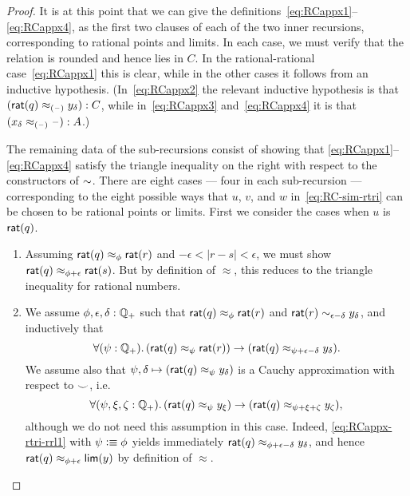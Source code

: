 \begin{proof}
  It is at this point that we can give the definitions~\eqref{eq:RCappx1}--\eqref{eq:RCappx4}, as the first two clauses of each of the two inner recursions, corresponding to rational points and limits.
  In each case, we must verify that the relation is rounded and hence lies in $C$.
  In the rational-rational case~\eqref{eq:RCappx1} this is clear, while in the other cases it follows from an inductive hypothesis.
  (In~\eqref{eq:RCappx2} the relevant inductive hypothesis is that $(\mathsf{rat}(q) \approx_{(\mathord{\hspace{1pt}\text{--}\hspace{1pt}})} y_\delta) : C$, while in~\eqref{eq:RCappx3} and~\eqref{eq:RCappx4} it is that $(x_\delta \approx_{(\mathord{\hspace{1pt}\text{--}\hspace{1pt}})} \mathord{\hspace{1pt}\text{--}\hspace{1pt}}) : A$.)

  The remaining data of the sub-recursions consist of showing that \eqref{eq:RCappx1}--\eqref{eq:RCappx4} satisfy the triangle inequality on the right with respect to the constructors of $\mathord\sim$.
  There are eight cases --- four in each sub-recursion --- corresponding to the eight possible ways that $u$, $v$, and $w$ in~\eqref{eq:RC-sim-rtri} can be chosen to be rational points or limits.
  First we consider the cases when $u$ is $\mathsf{rat}(q)$.
  \begin{enumerate}
  \item Assuming $\mathsf{rat}(q)\approx_\phi \mathsf{rat}(r)$ and $-\epsilon<|r-s|<\epsilon$, we must show $\mathsf{rat}(q)\approx_{\phi+\epsilon} \mathsf{rat}(s)$.
    But by definition of $\approx$, this reduces to the triangle inequality for rational numbers.
  \item We assume $\phi,\epsilon,\delta:\mathbb{Q}_{+}$ such that $\mathsf{rat}(q)\approx_\phi \mathsf{rat}(r)$ and $\mathsf{rat}(r) \sim_{\epsilon-\delta} y_\delta$, and inductively that
    \begin{equation}
      \fall{\psi:\Qp}(\rcrat(q) \approx_{\psi} \rcrat(r)) \to (\rcrat(q) \approx_{\psi+\epsilon-\delta} y_\delta).\label{eq:RCappx-rtri-rrl1}
    \end{equation}
    We assume also that $\psi,\delta\mapsto (\mathsf{rat}(q) \approx_{\psi} y_\delta)$ is a Cauchy approximation with respect to $\smile$, i.e.\
    \begin{equation}
      \fall{\psi,\xi,\zeta:\Qp} (\rcrat(q) \approx_{\psi} y_\xi) \to (\rcrat(q) \approx_{\psi+\xi+\zeta} y_\zeta),\label{eq:RCappx-rtri-rrl2}
    \end{equation}
    although we do not need this assumption in this case.
    Indeed, \eqref{eq:RCappx-rtri-rrl1} with $\psi\vcentcolon\equiv \phi$ yields immediately $\mathsf{rat}(q) \approx_{\phi+\epsilon-\delta} y_\delta$, and hence $\mathsf{rat}(q) \approx_{\phi+\epsilon} \mathsf{lim}(y)$ by definition of $\approx$.

\end{enumerate}
\end{proof}
